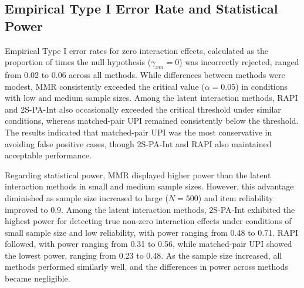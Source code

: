 \documentclass[
  man]{apa6}
\begin{document}
\subsection{Empirical Type I Error Rate and Statistical Power}\label{empirical-type-i-error-rate-and-statistical-power-1}

Empirical Type I error rates for zero interaction effects, calculated as the proportion of times the null hypothesis (\(\gamma_{xm} = 0\)) was incorrectly rejected, ranged from 0.02 to 0.06 across all methods. While differences between methods were modest, MMR consistently exceeded the critical value (\(\alpha = 0.05\)) in conditions with low and medium sample sizes. Among the latent interaction methods, RAPI and 2S-PA-Int also occasionally exceeded the critical threshold under similar conditions, whereas matched-pair UPI remained consistently below the threshold. The results indicated that matched-pair UPI was the most conservative in avoiding false positive cases, though 2S-PA-Int and RAPI also maintained acceptable performance.

Regarding statistical power, MMR displayed higher power than the latent interaction methods in small and medium sample sizes. However, this advantage diminished as sample size increased to large (\(\textit{N} = 500\)) and item reliability improved to 0.9. Among the latent interaction methods, 2S-PA-Int exhibited the highest power for detecting true non-zero interaction effects under conditions of small sample size and low reliability, with power ranging from 0.48 to 0.71. RAPI followed, with power ranging from 0.31 to 0.56, while matched-pair UPI showed the lowest power, ranging from 0.23 to 0.48. As the sample size increased, all methods performed similarly well, and the differences in power across methods became negligible.
\end{document}
